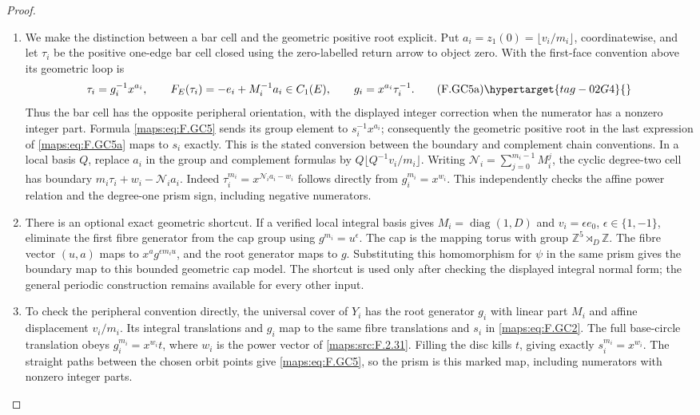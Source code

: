 \begin{proof}
\begin{enumerate}[label={$\langle1\rangle$\arabic*.}]
\item We make the distinction between a bar cell and the geometric
positive root explicit.  Put
$a_i=z_1(0)=\lfloor v_i/m_i\rfloor$, coordinatewise, and
let $\tau_i$ be the positive one-edge bar cell closed using
the zero-labelled return arrow to object zero.  With the
first-face convention above its geometric loop is
\[
 \tau_i=g_i^{-1}x^{a_i},\qquad
 F_E(\tau_i)=-e_i+M_i^{-1}a_i\in C_1(E),\qquad
 g_i=x^{a_i}\tau_i^{-1}.                                  \tag{F.GC5a}\hypertarget{tag-02G4}{}\label{maps:eq:F.GC5a}
\]
Thus the bar cell has the opposite peripheral orientation,
with the displayed integer correction when the numerator
has a nonzero integer part.  Formula \eqref{maps:eq:F.GC5} sends its
group element to $s_i^{-1}x^{a_i}$; consequently the
geometric positive root in the last expression of \eqref{maps:eq:F.GC5a}
maps to $s_i$ exactly.  This is the stated conversion between
the boundary and complement chain conventions.  In a local basis
$Q$, replace $a_i$ in the group and complement formulas by
$Q\lfloor Q^{-1}v_i/m_i\rfloor$.
Writing $\mathcal N_i=\sum_{j=0}^{m_i-1}M_i^j$, the cyclic
degree-two cell has boundary
$m_i\tau_i+w_i-\mathcal N_i a_i$.
Indeed $\tau_i^{m_i}=x^{\mathcal N_i a_i-w_i}$ follows
directly from $g_i^{m_i}=x^{w_i}$.
This independently checks the affine power relation and
the degree-one prism sign, including negative numerators.

\item There is an optional exact geometric shortcut.  If a verified
local integral basis gives $M_i=\operatorname{diag}(1,D)$ and
$v_i=\epsilon e_0$, $\epsilon\in\{1,-1\}$, eliminate the
first fibre generator from the cap group using
$g^{m_i}=u^\epsilon$.  The cap is the mapping torus with
group $\mathbb Z^5\rtimes_D\mathbb Z$.
The fibre vector $(u,a)$ maps to $x^a g^{\epsilon m_i u}$,
and the root generator maps to $g$.  Substituting this
homomorphism for $\psi$ in the same prism gives the boundary
map to this bounded geometric cap model.  The shortcut is
used only after checking the displayed integral normal form;
the general periodic construction remains available for
every other input.

\item To check the peripheral convention directly, the universal
cover of $Y_i$ has the root generator $g_i$ with linear part
$M_i$ and affine displacement $v_i/m_i$.  Its integral
translations and $g_i$ map to the same fibre translations
and $s_i$ in \eqref{maps:eq:F.GC2}.  The full base-circle translation obeys
$g_i^{m_i}=x^{w_i}t$, where $w_i$ is the power vector of
\ref{maps:src:F.2.31}.  Filling the disc kills $t$, giving exactly
$s_i^{m_i}=x^{w_i}$.  The straight paths between the chosen
orbit points give \eqref{maps:eq:F.GC5}, so the prism is this marked map,
including numerators with nonzero integer parts.


\end{enumerate}
\end{proof}
